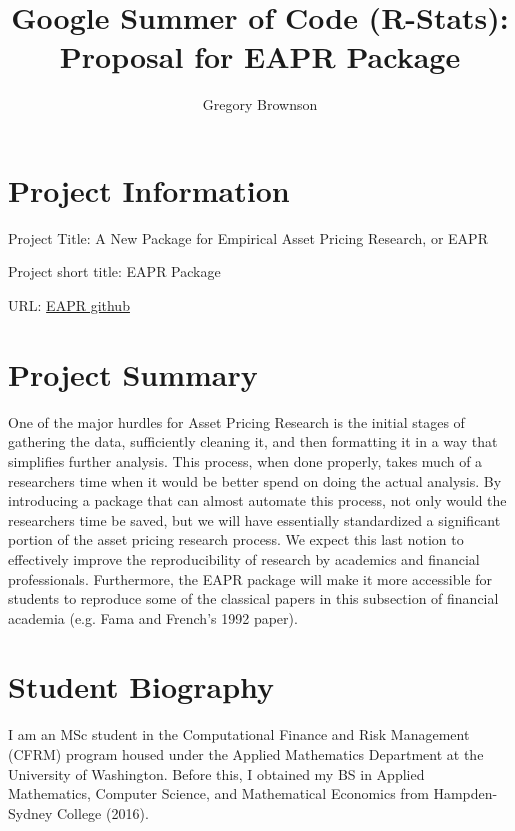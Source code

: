 \documentclass[english]{article}\usepackage[]{graphicx}\usepackage[]{color}
\begin{document}
\title{Google Summer of Code (R-Stats): Proposal for EAPR Package}
\author{Gregory Brownson}
\maketitle

\section*{Project Information}

Project Title: A New Package for Empirical Asset Pricing Research, or EAPR

Project short title: EAPR Package

URL: \href{https://github.com/GregoryBrownson/EAPR}{EAPR github}

\section*{Project Summary}

One of the major hurdles for Asset Pricing Research is the initial stages of gathering the data, sufficiently cleaning it, and then formatting it in a way that simplifies further analysis. This process, when done properly, takes much of a researchers time when it would be better spend on doing the actual analysis. By introducing a package that can almost automate this process, not only would the researchers time be saved, but we will have essentially standardized a significant portion of the asset pricing research process. We expect this last notion to effectively improve the reproducibility of research by academics and financial professionals. Furthermore, the EAPR package will make it more accessible for students to reproduce some of the classical papers in this subsection of financial academia (e.g. Fama and French's 1992 paper).

\section*{Student Biography}
I am an MSc student in the Computational Finance and Risk Management (CFRM) program housed under the Applied Mathematics Department at the University of Washington. Before this, I obtained my BS in Applied Mathematics, Computer Science, and Mathematical Economics from Hampden-Sydney College (2016).
\end{document}
